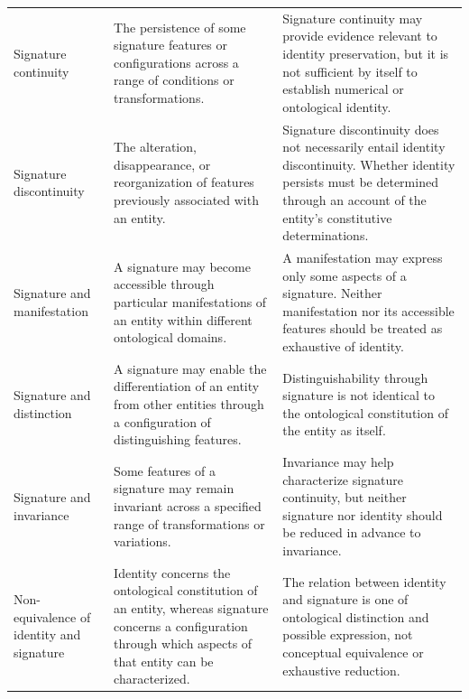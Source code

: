 \begin{table}[htbp]
\begin{tabular}{p{3.2cm} p{5.1cm} p{5.3cm}}
        Signature continuity &
        The persistence of some signature features or configurations across a range of conditions or transformations. &
        Signature continuity may provide evidence relevant to identity preservation, but it is not sufficient by itself to establish numerical or ontological identity. \\

        Signature discontinuity &
        The alteration, disappearance, or reorganization of features previously associated with an entity. &
        Signature discontinuity does not necessarily entail identity discontinuity. Whether identity persists must be determined through an account of the entity's constitutive determinations. \\

        Signature and manifestation &
        A signature may become accessible through particular manifestations of an entity within different ontological domains. &
        A manifestation may express only some aspects of a signature. Neither manifestation nor its accessible features should be treated as exhaustive of identity. \\

        Signature and distinction &
        A signature may enable the differentiation of an entity from other entities through a configuration of distinguishing features. &
        Distinguishability through signature is not identical to the ontological constitution of the entity as itself. \\

        Signature and invariance &
        Some features of a signature may remain invariant across a specified range of transformations or variations. &
        Invariance may help characterize signature continuity, but neither signature nor identity should be reduced in advance to invariance. \\

        Non-equivalence of identity and signature &
        Identity concerns the ontological constitution of an entity, whereas signature concerns a configuration through which aspects of that entity can be characterized. &
        The relation between identity and signature is one of ontological distinction and possible expression, not conceptual equivalence or exhaustive reduction. \\

        \hline
    \end{tabular}
\end{table}
